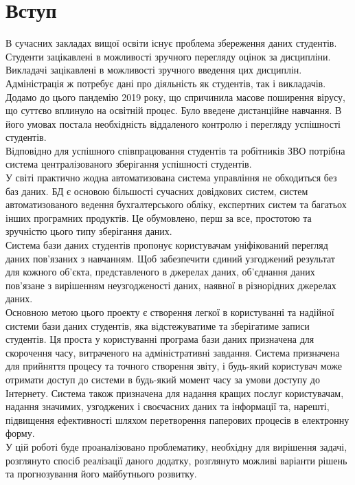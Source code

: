 \documentclass[14pt,a4paper,oneside]{extbook}
\begin{document}

\setcounter{page}{1}
\tableofcontents
\chapter{Вступ}
	В сучасних закладах вищої освіти існує проблема збереження даних студентів. Студенти зацікавлені в можливості зручного перегляду оцінок за дисципліни. Викладачі зацікавлені в можливості зручного введення цих дисциплін. Адміністрація ж потребує дані про діяльність як студентів, так і викладачів.\\
	Додамо до цього пандемію 2019 року, що спричинила масове поширення вірусу, що суттєво вплинуло на освітній процес. Було введене дистанційне навчання. В його умовах постала необхідність віддаленого контролю і перегляду успішності студентів.\\
	Відповідно для успішного співпрацювання студентів та робітників ЗВО потрібна система централізованого зберігання успішності студентів.\\
	У світі практично жодна автоматизована система управління не обходиться без баз даних. БД є основою більшості сучасних довідкових систем, систем автоматизованого ведення бухгалтерського обліку, експертних систем та багатьох інших програмних продуктів. Це обумовлено, перш за все, простотою та зручністю цього типу зберігання даних. \\
	Система бази даних студентів пропонує користувачам уніфікований перегляд даних пов'язаних з навчанням. Щоб забезпечити єдиний узгоджений результат для кожного об’єкта, представленого в джерелах даних, об’єднання даних пов’язане з вирішенням неузгодженості даних, наявної в різнорідних джерелах даних. \\
	Основною метою цього проекту є створення легкої в користуванні та надійної системи бази даних студентів, яка відстежуватиме та зберігатиме записи студентів. Ця проста у користуванні програма бази даних призначена для скорочення часу, витраченого на адміністративні завдання. Система призначена для прийняття процесу та точного створення звіту, і будь-який користувач може отримати доступ до системи в будь-який момент часу за умови доступу до Інтернету. Система також призначена для надання кращих послуг користувачам, надання значимих, узгоджених і своєчасних даних та інформації та, нарешті, підвищення ефективності шляхом перетворення паперових процесів в електронну форму.\\
	У цій роботі буде проаналізовано проблематику, необхідну для вирішення задачі, розглянуто спосіб реалізації даного додатку, розглянуто можливі варіанти рішень та прогнозування його майбутнього розвитку.
\end{document}
